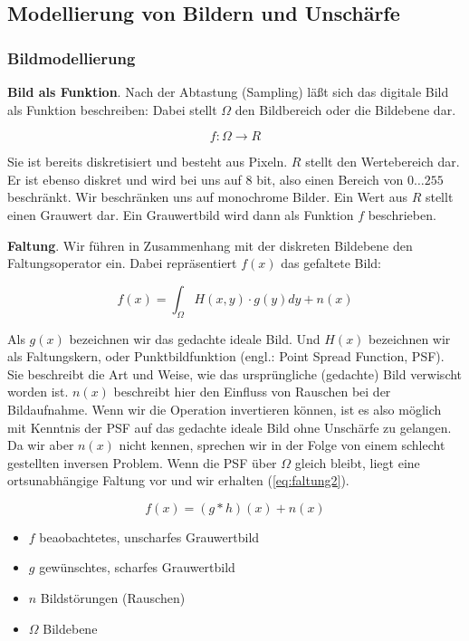 \documentclass[a4paper,12pt]{article}
\begin{document}
\subsection{Modellierung von Bildern und Unschärfe}

\subsubsection{Bildmodellierung}

\textbf{Bild als Funktion}. Nach der Abtastung (Sampling) läßt sich das
digitale Bild als Funktion beschreiben:
Dabei stellt $\Omega$ den Bildbereich oder die Bildebene dar.

\begin{equation} \label{eq:discrete}
f: \Omega \to R
\end{equation}

Sie ist bereits
diskretisiert und besteht aus Pixeln. $R$ stellt den Wertebereich dar. Er
ist ebenso diskret und wird bei uns auf 8 bit, also einen Bereich von
$0\ldots255$ beschränkt. Wir beschränken uns auf monochrome Bilder. Ein Wert
aus $R$ stellt einen Grauwert dar. Ein Grauwertbild wird dann als Funktion $f$
beschrieben.


\textbf{Faltung}. Wir führen in Zusammenhang mit der diskreten Bildebene den
Faltungsoperator ein. Dabei repräsentiert $f(x)$ das gefaltete Bild:

\begin{equation} \label{eq:faltung1}
f(x)=\int_\Omega{H(x,y) \cdot g(y)dy+n(x)}
\end{equation}

Als $g(x)$ bezeichnen wir das gedachte ideale Bild. Und $H(x)$ bezeichnen wir als Faltungskern,
 oder Punktbildfunktion
(engl.: Point Spread Function, PSF). Sie beschreibt die Art und Weise, wie das
ursprüngliche (gedachte) Bild verwischt worden ist. $n(x)$ beschreibt
hier den Einfluss von Rauschen bei der Bildaufnahme. Wenn wir die Operation invertieren können, ist es also möglich
mit Kenntnis der PSF auf das gedachte ideale Bild ohne Unschärfe zu gelangen. Da
wir aber $n(x)$ nicht kennen, sprechen wir in der Folge von einem schlecht
gestellten inversen Problem.
Wenn die PSF über $\Omega$ gleich bleibt, liegt eine ortsunabhängige Faltung
vor und wir erhalten (\ref{eq:faltung2}).

\begin{equation} \label{eq:faltung2}
f(x)=(g*h)(x)+n(x)
\end{equation}

\begin{itemize}
  \itemsep -1pt
  \item $f$ beaobachtetes, unscharfes Grauwertbild
  \item $g$ gewünschtes, scharfes Grauwertbild
  \item $n$ Bildstörungen (Rauschen)
  \item $\Omega$ Bildebene
\end{itemize}
\end{document}
